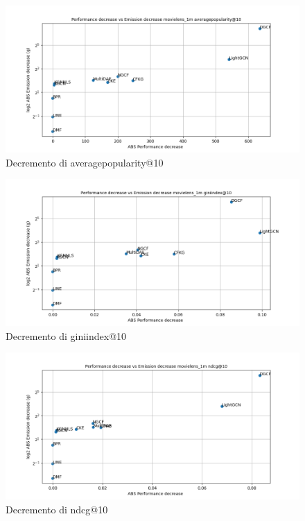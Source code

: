 \begin{figure}[H]
    \centering
     \includegraphics[width=\textwidth]{images/decrement_averagepopularity@10_movielens_1m_30_5.png}
    \caption{Decremento di averagepopularity@10}
\end{figure}

\begin{figure}[H]
    \centering
     \includegraphics[width=\textwidth]{images/decrement_giniindex@10_movielens_1m_30_5.png}
    \caption{Decremento di giniindex@10}
\end{figure}

\begin{figure}[H]
    \centering
     \includegraphics[width=\textwidth]{images/decrement_ndcg@10_movielens_1m_30_5.png}
    \caption{Decremento di ndcg@10}
\end{figure}

